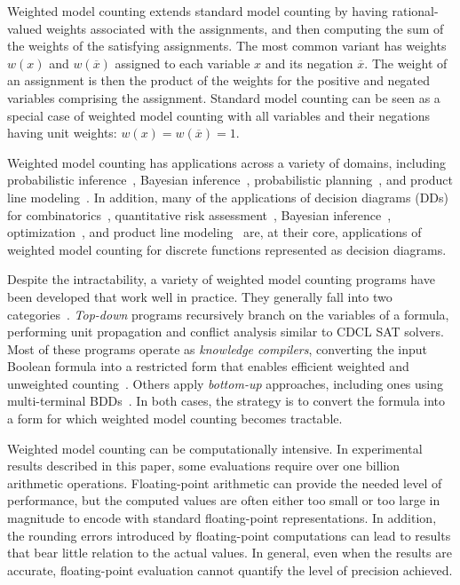 \documentclass[letterpaper,USenglish,cleveref, autoref, thm-restate]{lipics-v2021}
\newcommand{\obar}[1]{\overline{#1}}
\begin{document}
Weighted model counting extends standard model counting by having
rational-valued weights associated with the assignments, and then
computing the sum of the weights of the satisfying assignments.  The
most common variant has weights $w(x)$ and $w(\obar{x})$
assigned to each variable $x$ and its negation $\obar{x}$.  The
weight of an assignment is then the product of the weights for
the positive and negated variables comprising the assignment.
Standard model counting can be seen as a special case of weighted model
counting with all variables and their negations having unit weights: $w(x) = w(\obar{x}) = 1$.

Weighted model counting has applications across a variety of domains,
including probabilistic inference~\cite{chavira:ai:2008,dubray:cp:2024}, Bayesian
inference~\cite{sang:aaai:2005}, probabilistic
planning~\cite{domshlak:jair:2007}, and product line modeling~\cite{sundermann:eme:2023,sundermann:tsem:2024}.  In addition, many of the
applications of decision diagrams (DDs) for
combinatorics~\cite{knuth:bdd:2011}, quantitative risk
assessment~\cite{andrews:ieeetr:2000,groen:ress:2006,xing:wiley:2015,xing:amm:2025},
Bayesian inference~\cite{minato:ijcai:2007},
optimization~\cite{bergman:book:2016}, and
product line modeling~\cite{andersen:jair:2010,benavides:is:2010} are, at their core, applications of
weighted model counting for discrete functions represented as decision diagrams.

Despite the intractability, a variety of weighted model counting
programs have been developed that work well in practice.  They
generally fall into two categories~\cite{shaw:kr:2024}. \emph{Top-down} programs
recursively branch on the variables of a formula, performing unit
propagation and conflict analysis similar to CDCL SAT solvers.  Most
of these programs operate as \emph{knowledge compilers}, converting
the input Boolean formula into a restricted form that enables efficient
weighted and unweighted counting~\cite{darwiche:aaai:2002,darwiche:ecai:2004,lagniez:ijcai:2017,muise:cai:2012,oztok:cp:2014,sharma:ijcai:2019}.
Others apply \emph{bottom-up} approaches, including ones using
multi-terminal BDDs~\cite{dudek:aaai:2020,dudek:sat:2021}.  In both
cases, the strategy is to convert the formula into a form for which
weighted model counting becomes tractable.

Weighted model counting can be computationally intensive.  In
experimental results described in this paper, some evaluations 
require over one billion arithmetic operations.
Floating-point arithmetic can provide the needed level of performance,
but the computed values are often either too small or too
large in magnitude to encode with standard floating-point
representations.  In addition, the rounding errors
introduced by floating-point computations can lead to results
that bear little relation to the actual values.  In general, even when the results are accurate,
floating-point evaluation cannot quantify the level of precision achieved.
\end{document}
